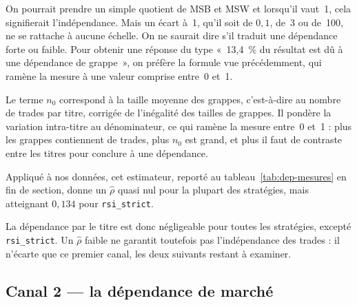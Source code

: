 On pourrait prendre un simple quotient de MSB et MSW et lorsqu'il vaut~1,
cela signifierait l'indépendance. Mais un écart à~1, qu'il soit de
$0{,}1$, de~3 ou de~100, ne se rattache à aucune échelle. On ne saurait
dire s'il traduit une dépendance forte ou faible.
Pour obtenir une réponse du type «~13{,}4~\% du résultat est dû à une
dépendance de grappe~», on préfère la formule vue précédemment, qui ramène
la mesure à une valeur comprise entre~0 et~1.

Le terme $n_0$ correspond à la taille moyenne des grappes, c'est-à-dire au
nombre de trades par titre, corrigée de l'inégalité des tailles de grappes.
Il pondère la variation intra-titre au dénominateur, ce qui ramène la mesure
entre~0 et~1 : plus les grappes contiennent de trades, plus $n_0$ est grand,
et plus il faut de contraste entre les titres pour conclure à une dépendance.

Appliqué à nos données, cet estimateur, reporté au
tableau~\ref{tab:dep-mesures} en fin de section, donne un $\hat\rho$ quasi nul
pour la plupart des stratégies, mais atteignant $0{,}134$ pour
\texttt{rsi\_strict}.

La dépendance par le titre est donc négligeable pour toutes les stratégies,
excepté \texttt{rsi\_strict}. Un $\hat\rho$ faible ne garantit toutefois pas
l'indépendance des trades : il n'écarte que ce premier canal, les deux suivants
restant à examiner.


\subsection{Canal 2 --- la dépendance de marché}
\label{sec:dep-canal2}


